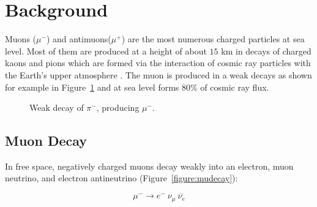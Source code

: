 
\section{Background}\label{background}

Muons ($\mu^-$) and antimuons($\mu^+$) are the most numerous charged
particles at sea level\cite{pdg}. Most of them are produced at a
height of about $15$ km in decays of charged kaons and pions which are
formed via the interaction of cosmic ray particles with the Earth's
upper atmosphere \cite{amsler}. The muon is produced in a weak decays
as shown for example in Figure~\ref{figure:pidecay} and at sea level forms $80\%$ of cosmic
ray flux.

\begin{figure}[h]
\begin{center}
\caption{Weak decay of $\pi^-$, producing $\mu^-$.}
\label{figure:pidecay}
\end{center}
\end{figure}


\subsection{Muon Decay}

In free space, negatively charged muons decay weakly into an electron,
muon neutrino, and electron antineutrino \cite{easwar}
(Figure~\ref{figure:mudecay}):

\begin{equation}\mu^- \rightarrow e^-~\nu_{\mu}~\overline{\nu_e}\label{mudecay}\end{equation}

